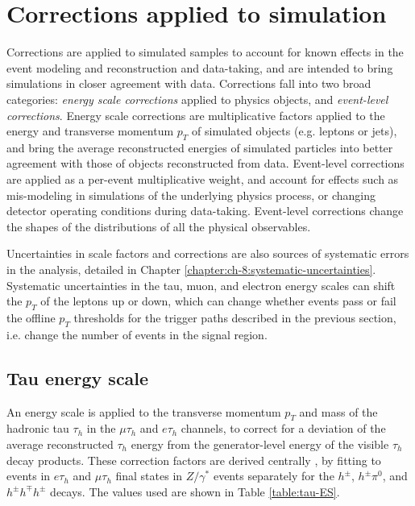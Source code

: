 \section{Corrections applied to simulation}
\label{sec:corrections_applied}

Corrections are applied to simulated samples to account for known effects in the event modeling and reconstruction and data-taking, and are intended to bring simulations in closer agreement with data. Corrections fall into two broad categories: \textit{energy scale corrections} applied to physics objects, and \textit{event-level corrections}. Energy scale corrections are multiplicative factors applied to the energy and transverse momentum $p_{T}$ of simulated objects (e.g. leptons or jets), and bring the average reconstructed energies of simulated particles into better agreement with those of objects reconstructed from data. Event-level corrections are applied as a per-event multiplicative weight, and account for effects such as mis-modeling in simulations of the underlying physics process, or changing detector operating conditions during data-taking. Event-level corrections change the shapes of the distributions of all the physical observables.  

Uncertainties in scale factors and corrections are also sources of systematic errors in the analysis, detailed in Chapter \ref{chapter:ch-8:systematic-uncertainties}. Systematic uncertainties in the tau, muon, and electron energy scales can shift the $p_{T}$ of the leptons up or down, which can change whether events pass or fail the offline $p_{T}$ thresholds for the trigger paths described in the previous section, i.e. change the number of events in the signal region.  

\subsection{Tau energy scale}
\label{sec:tau_energy_scale}

An energy scale is applied to the transverse momentum $p_{T}$ and mass of the hadronic tau $\tau_{h}$ in the $\mu\tau_{h}$ and $e\tau_{h}$ channels, to correct for a deviation of the average reconstructed $\tau_{h}$ energy from the generator-level energy of the visible $\tau_{h}$ decay products. These correction factors are derived centrally \cite{CMS-TAU-16-003}, by fitting to events in $e\tau_{h}$ and $\mu\tau_{h}$ final states in $Z/\gamma^*$ events separately for the $h^\pm$, $h^\pm \pi^0$, and $h^\pm h^\mp h^\pm$ decays. The values used are shown in Table \ref{table:tau-ES}.

